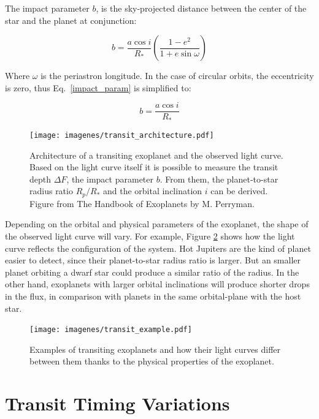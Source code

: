 The impact parameter $b$, is the sky-projected distance between the center of the star and the planet at conjunction:

\begin{equation}
    b = \frac{a\cos{i}}{R_{*}}\left(\frac{1-e^2}{1+e\sin{\omega}}\right)
\label{impact_param}
\end{equation}

Where $\omega$ is the periastron longitude. In the case of circular orbits, the eccentricity is zero, thus Eq.~\ref{impact_param} is simplified to:

\begin{equation}
    b = \frac{a\cos{i}}{R_{*}}
\label{impact_param_simple}
\end{equation}

\begin{figure}[H]
\centering
\texttt{[image: imagenes/transit\_architecture.pdf]}
\caption{Architecture of a transiting exoplanet and the observed light curve. Based on the light curve itself it is possible to measure the transit depth $\Delta F$, the impact parameter $b$. From them, the planet-to-star radius ratio $R_{p}/R_{*}$ and the orbital inclination $i$ can be derived. Figure from The Handbook of Exoplanets by M. Perryman.}
\label{transit}
\end{figure}

Depending on the orbital and physical parameters of the exoplanet, the shape of the observed light curve will vary. For example, Figure \ref{transit_examples} shows how the light curve reflects the configuration of the system. Hot Jupiters are the kind of planet easier to detect, since their planet-to-star radius ratio is larger. But an smaller planet orbiting a dwarf star could produce a similar ratio of the radius. In the other hand, exoplanets with larger orbital inclinations will produce shorter drops in the flux, in comparison with planets in the same orbital-plane with the host star.     

\begin{figure}[H]
\centering
\texttt{[image: imagenes/transit\_example.pdf]}
\caption{Examples of transiting exoplanets and how their light curves differ between them thanks to the physical properties of the exoplanet.}
\label{transit_examples}
\end{figure}

\section{Transit Timing Variations}

